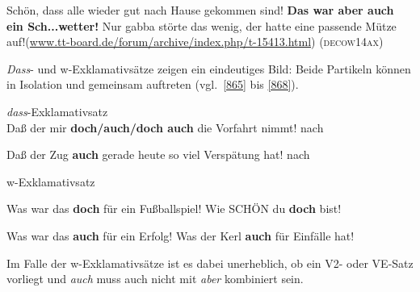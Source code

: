 {\begin{exe}
	\ex\label{864}

	Schön, dass alle wieder gut nach Hause gekommen sind! \textbf{Das war aber auch ein Sch...wetter!} Nur gabba störte das wenig, der hatte eine 				passende Mütze auf!\hfill\hbox{(\url{www.tt-board.de/forum/archive/index.php/t-15413.html})}
	\newline
	\hbox{}\hfill\hbox{\scshape(decow14ax)}
\end{exe}   													  
\textit{Dass}- und w-Exklamativsätze zeigen ein eindeutiges Bild: Beide Partikeln können in Isolation und gemeinsam auftreten (vgl.\ \ref{865} bis \ref{868}).

\begin{exe}
	\ex\label{865} \textit{dass}-Exklamativsatz\\
	Daß der mir \textbf{doch/auch/doch auch} die Vorfahrt nimmt!  
	\newline
	\hbox{}\hfill\hbox{nach \citet[152]{Zaefferer1988}}
\end{exe} 

\begin{exe}
	\ex\label{866} 
	Daß der Zug \textbf{auch} gerade heute so viel Verspätung hat!
	\newline
	\hbox{}\hfill\hbox{nach \citet[90]{Helbig1990}}
\end{exe} 	

\begin{exe}
	\ex\label{867}w-Exklamativsatz\\[-1.25em]
		\begin{xlist}	
			\ex\label{867a} Was war das \textbf{doch} für ein Fußballspiel!	
			\hfill\hbox{\citet[116]{Helbig1990}}
	 		\ex\label{867b} Wie SCHÖN du \textbf{doch} bist!		
	 		\hfill\hbox{\citet[218--219]{Rinas2006}}
		\end{xlist}
\end{exe}

\begin{exe}
	\ex\label{868}
		\begin{xlist}	
			\ex\label{868a} Was war das \textbf{auch} für ein Erfolg!
			\hfill\hbox{\citet[90]{Helbig1990}}
	 		\ex\label{868b} Was der Kerl \textbf{auch} für Einfälle hat!		
	 		\hfill\hbox{\citet[177]{Schubiger1977}}
		\end{xlist}
\end{exe}	
Im Falle der w-Exklamativsätze ist es dabei unerheblich, ob ein V2- oder VE-Satz vorliegt und \textit{auch} muss auch nicht mit \textit{aber} kombiniert sein.

}
